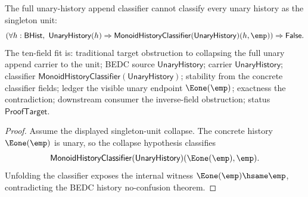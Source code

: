 
\begin{theorem}
\label{thm:unary-append-singleton-collapse-obstruction}
The full unary-history append classifier cannot classify every unary history
as the singleton unit:
$$
\left(
\forall h:\mathsf{BHist},\
\mathsf{UnaryHistory}(h)\Rightarrow
\mathsf{MonoidHistoryClassifier}(\mathsf{UnaryHistory})(h,\emp)
\right)
\Rightarrow \mathsf{False}.
$$
The ten-field fit is: traditional target obstruction to collapsing the full
unary append carrier to the unit; BEDC source $\mathsf{UnaryHistory}$; carrier
$\mathsf{UnaryHistory}$; classifier
$\mathsf{MonoidHistoryClassifier}(\mathsf{UnaryHistory})$; stability from the
concrete classifier fields; ledger the visible unary endpoint $\Eone(\emp)$;
exactness the contradiction; downstream consumer the inverse-field obstruction;
status $\mathsf{ProofTarget}$.
\end{theorem}
\begin{proof}
Assume the displayed singleton-unit collapse. The concrete history
$\Eone(\emp)$ is unary, so the collapse hypothesis classifies
$$
\mathsf{MonoidHistoryClassifier}(\mathsf{UnaryHistory})(\Eone(\emp),\emp).
$$
Unfolding the classifier exposes the internal witness
$\Eone(\emp)\hsame\emp$, contradicting the BEDC history no-confusion theorem.
\end{proof}

